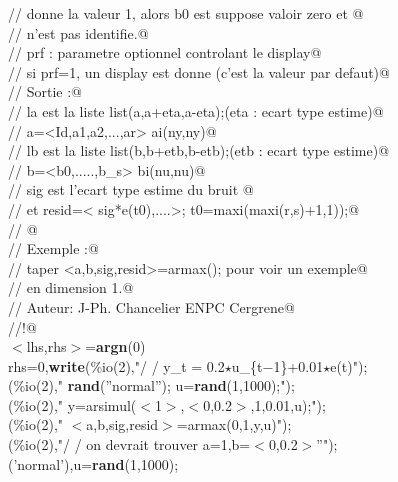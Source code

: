 {\begin{flushleft}
{\cmarg \verb@//         donne la valeur 1, alors b0 est suppose valoir zero et @\\ 
\cmarg \verb@//         n'est pas identifie.@\\ 
\cmarg \verb@//     prf : parametre optionnel controlant le display@\\ 
\cmarg \verb@//         si prf=1, un display est donne (c'est la valeur par defaut)@\\ 
\cmarg \verb@// Sortie :@\\ 
\cmarg \verb@//     la est la liste list(a,a+eta,a-eta);(eta : ecart type estime)@\\ 
\cmarg \verb@//        a=<Id,a1,a2,...,ar> ai(ny,ny)@\\ 
\cmarg \verb@//     lb est la liste list(b,b+etb,b-etb);(etb : ecart type estime)@\\ 
\cmarg \verb@//        b=<b0,.....,b\_s> bi(nu,nu)@\\ 
\cmarg \verb@//     sig est l'ecart type estime du bruit @\\ 
\cmarg \verb@//     et resid=< sig*e(t0),....>; t0=maxi(maxi(r,s)+1,1));@\\ 
\cmarg \verb@//     @\\ 
\cmarg \verb@// Exemple :@\\ 
\cmarg \verb@//     taper <a,b,sig,resid>=armax(); pour voir un exemple@\\ 
\cmarg \verb@//     en dimension 1.@\\ 
\cmarg \verb@// Auteur: J-Ph. Chancelier ENPC Cergrene@\\ 
\cmarg \verb@//!@\\ 
\cmarg $<$lhs,rhs$>$={\bf argn}(0)\\ 
 rhs=0,{\bf write}(\%io(2),"/ / y\_t = 0.2$\star$u\_\{t$-$1\}+0.01$\star$e(t)"); \\ 
\cmarg \hspace{2.0cm}{\bf write}(\%io(2)," {\bf rand}(''normal''); u={\bf rand}(1,1000);");\\ 
\cmarg \hspace{2.0cm}{\bf write}(\%io(2)," y=arsimul($<$1$>$,$<$0,0.2$>$,1,0.01,u);");\\ 
\cmarg \hspace{2.0cm}{\bf write}(\%io(2)," $<$a,b,sig,resid$>$=armax(0,1,y,u)");\\ 
\cmarg \hspace{2.0cm}{\bf write}(\%io(2),"/ / on devrait trouver a=1,b=$<$0,0.2$>$''");\\ 
\cmarg \hspace{2.0cm}{\bf rand}('normal'),u={\bf rand}(1,1000);\\ 
}
\end{flushleft}}
